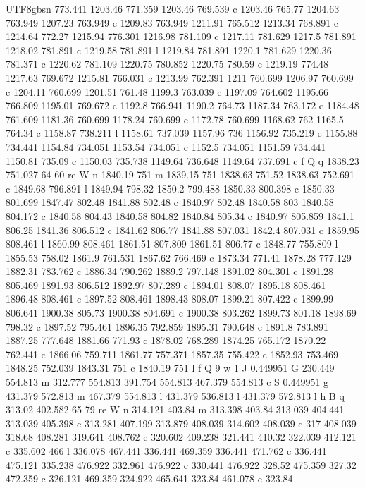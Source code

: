 \documentclass[11pt,a4paper,oneside]{report}
\begin{document}
\begin{CJK*}{UTF8}{gbsn}
{773.441 1203.46 771.359 1203.46 769.539 c 1203.46 765.77 1204.63 763.949 1207.23 763.949 c 1209.83
763.949 1211.91 765.512 1213.34 768.891 c 1214.64 772.27 1215.94 776.301 1216.98 781.109 c 1217.11
781.629 1217.5 781.891 1218.02 781.891 c 1219.58 781.891 l 1219.84 781.891 1220.1 781.629 1220.36 781.371
c 1220.62 781.109 1220.75 780.852 1220.75 780.59 c 1219.19 774.48 1217.63 769.672 1215.81 766.031 c
1213.99 762.391 1211 760.699 1206.97 760.699 c 1204.11 760.699 1201.51 761.48 1199.3 763.039 c 1197.09
764.602 1195.66 766.809 1195.01 769.672 c 1192.8 766.941 1190.2 764.73 1187.34 763.172 c 1184.48 761.609
1181.36 760.699 1178.24 760.699 c 1172.78 760.699 1168.62 762 1165.5 764.34 c 1158.87 738.211 l 1158.61
737.039 1157.96 736 1156.92 735.219 c 1155.88 734.441 1154.84 734.051 1153.54 734.051 c 1152.5 734.051
1151.59 734.441 1150.81 735.09 c 1150.03 735.738 1149.64 736.648 1149.64 737.691 c f Q q 1838.23 751.027
64 60 re W n 1840.19 751 m 1839.15 751 1838.63 751.52 1838.63 752.691 c 1849.68 796.891 l 1849.94 798.32
1850.2 799.488 1850.33 800.398 c 1850.33 801.699 1847.47 802.48 1841.88 802.48 c 1840.97 802.48 1840.58
803 1840.58 804.172 c 1840.58 804.43 1840.58 804.82 1840.84 805.34 c 1840.97 805.859 1841.1 806.25
1841.36 806.512 c 1841.62 806.77 1841.88 807.031 1842.4 807.031 c 1859.95 808.461 l 1860.99 808.461
1861.51 807.809 1861.51 806.77 c 1848.77 755.809 l 1855.53 758.02 1861.9 761.531 1867.62 766.469 c
1873.34 771.41 1878.28 777.129 1882.31 783.762 c 1886.34 790.262 1889.2 797.148 1891.02 804.301 c 1891.28
805.469 1891.93 806.512 1892.97 807.289 c 1894.01 808.07 1895.18 808.461 1896.48 808.461 c 1897.52
808.461 1898.43 808.07 1899.21 807.422 c 1899.99 806.641 1900.38 805.73 1900.38 804.691 c 1900.38 803.262
1899.73 801.18 1898.69 798.32 c 1897.52 795.461 1896.35 792.859 1895.31 790.648 c 1891.8 783.891 1887.25
777.648 1881.66 771.93 c 1878.02 768.289 1874.25 765.172 1870.22 762.441 c 1866.06 759.711 1861.77
757.371 1857.35 755.422 c 1852.93 753.469 1848.25 752.039 1843.31 751 c 1840.19 751 l f Q 9 w 1 J
0.449951 G 230.449 554.813 m 312.777 554.813 391.754 554.813 467.379 554.813 c S 0.449951 g 431.379
572.813 m 467.379 554.813 l 431.379 536.813 l 431.379 572.813 l h B q 313.02 402.582 65 79 re W n 314.121
403.84 m 313.398 403.84 313.039 404.441 313.039 405.398 c 313.281 407.199 313.879 408.039 314.602 408.039
c 317 408.039 318.68 408.281 319.641 408.762 c 320.602 409.238 321.441 410.32 322.039 412.121 c 335.602
466 l 336.078 467.441 336.441 469.359 336.441 471.762 c 336.441 475.121 335.238 476.922 332.961 476.922 c
330.441 476.922 328.52 475.359 327.32 472.359 c 326.121 469.359 324.922 465.641 323.84 461.078 c 323.84
}
\end{CJK*}
\end{document}
